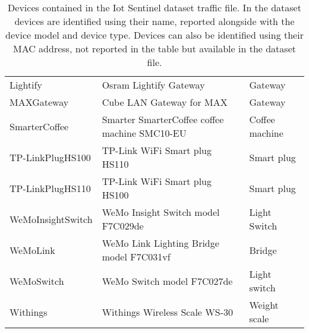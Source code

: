 \begin{table}[H]
\begin{tabular}{l|l|l}
  Lightify          & Osram Lightify Gateway & Gateway \\
  MAXGateway        & Cube LAN Gateway for MAX & Gateway \\
  SmarterCoffee     & Smarter SmarterCoffee coffee machine SMC10-EU &  Coffee machine\\
  TP-LinkPlugHS100  & TP-Link WiFi Smart plug HS110 & Smart plug \\
  TP-LinkPlugHS110  & TP-Link WiFi Smart plug HS100 & Smart plug \\
  WeMoInsightSwitch & WeMo Insight Switch model F7C029de & Light Switch \\
  WeMoLink          & WeMo Link Lighting Bridge model F7C031vf & Bridge  \\
  WeMoSwitch        & WeMo Switch model F7C027de & Light switch \\
  Withings          &  Withings Wireless Scale WS-30 &  Weight scale\\
    \bottomrule        
    \end{tabular}
    \caption{Devices contained in the Iot Sentinel dataset traffic file. In the dataset devices are identified using their name, reported alongside with the device model and device type. Devices can also be identified using their MAC address, not reported in the table but available in the dataset file.}
    \label{tab:iotdevlist}
\end{table}


